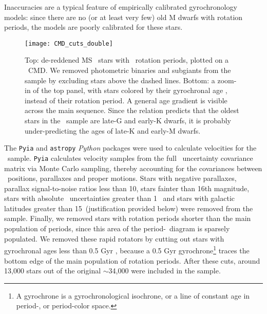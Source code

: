 Inaccuracies are a typical feature of empirically calibrated gyrochronology
models: since there are no (or at least very few) old M dwarfs with rotation
periods, the models are poorly calibrated for these stars.
\begin{figure}
  \caption{
      Top: de-reddened MS \kepler\ stars with \mct\ rotation periods, plotted
    on a \gaia\ CMD.
    We removed photometric binaries and subgiants from the sample by excluding
    stars above the dashed lines.
    Bottom: a zoom-in of the top panel, with stars colored by their
    gyrochronal age \citep{angus2019}, instead of their rotation period.
    A general age gradient is visible across the main sequence.
    Since the \citet{angus2019} relation predicts that the oldest stars in
    the \mct\ sample are late-G and early-K dwarfs, it is probably
    under-predicting the ages of late-K and early-M dwarfs.
}
  \centering
    \texttt{[image: CMD\_cuts\_double]}
\label{fig:age_gradient}
\end{figure}

The {\tt Pyia} \citep{price-whelan_2018} and {\tt astropy} \citep{astropy2013,
astropy2018} {\it Python} packages were used to calculate velocities for the
\mct\ sample.
{\tt Pyia} calculates velocity samples from the full \gaia\ uncertainty
covariance matrix via Monte Carlo sampling, thereby accounting for the
covariances between \gaia\ positions, parallaxes and proper motions.
Stars with negative parallaxes, parallax signal-to-noise ratios less than 10,
stars fainter than 16th magnitude, stars with absolute \vb\ uncertainties
greater than 1 \kms\, and stars with galactic latitudes greater than
15\degrees\ (justification provided below) were removed from the sample.
Finally, we removed stars with rotation periods shorter than the main
population of periods, since this area of the period-\teff\ diagram is
sparsely populated.
We removed these rapid rotators by cutting out stars with gyrochronal ages
less than 0.5 Gyr \citep[based on the][gyro-model]{angus2019}, because a 0.5
Gyr gyrochrone\footnote{A gyrochrone is a gyrochronological isochrone, or a
line of constant age in period-\teff, or period-color space.} traces the
bottom edge of the main population of rotation periods.
After these cuts, around 13,000 stars out of the original $\sim$34,000 were
included in the sample.

